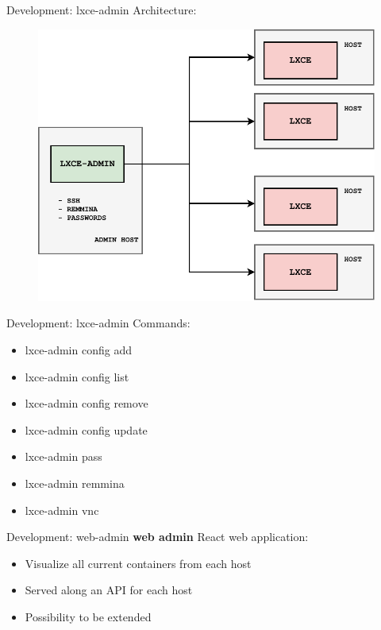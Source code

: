 \documentclass[10pt,english,handout,aspectradio=169]{beamer}
\begin{document}
\begin{frame}{Development: lxce-admin}
Architecture:
\begin{figure}
    \centering
    \includegraphics[scale=0.5]{img/lxce-admin-diagram.pdf} 
\end{figure}
\end{frame}
\begin{frame}{Development: lxce-admin}
Commands:
\begin{itemize}
    \item lxce-admin config add
    \item lxce-admin config list
    \item lxce-admin config remove
    \item lxce-admin config update
    \item lxce-admin pass
    \item lxce-admin remmina
    \item lxce-admin vnc
\end{itemize}
\end{frame}
\begin{frame}{Development: web-admin}
    \textbf{web admin} React web application:
    \begin{itemize}
        \item Visualize all current containers from each host
        \item Served along an API for each host
        \item Possibility to be extended
    \end{itemize}
\end{frame}
\end{document}
